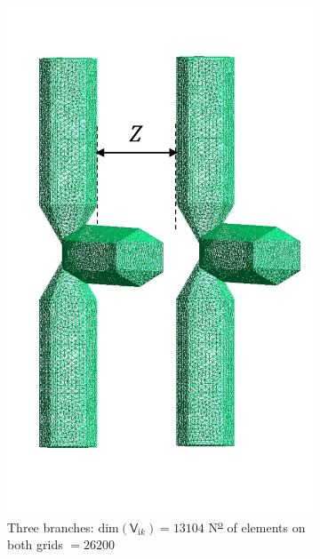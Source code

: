 \begin{figure}[H]
\begin{subfigure}{0.3\linewidth}
            \includegraphics[scale = 0.4]{figures/3branches}
            \caption{Three branches: $\text{dim}(\mathsf{V}_{\mathrm{i}k}) = 13104$ \newline N\textsuperscript{\underline{o}} of elements on both grids $ = 26200$}
            \end{subfigure}
            \begin{subfigure}{0.3\linewidth}
                \centering

\end{subfigure}
\end{figure}
